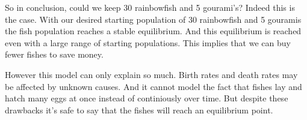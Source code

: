 \begin{flushleft}
    So in conclusion, could we keep 30 rainbowfish and 5 gourami's?
    Indeed this is the case. With our desired starting population of
    30 rainbowfish and 5 gouramis the fish population reaches a stable equilibrium.
    And this equilibrium is reached even with a large range of starting populations.
    This implies that we can buy fewer fishes to save money.
\end{flushleft}

\begin{flushleft}
    However this model can only explain so much. Birth rates and death
    rates may be affected by unknown causes. And it cannot model the fact
    that fishes lay and hatch many eggs at once instead of continiously over time.
    But despite these drawbacks it's safe to say that the fishes will reach an
    equilibrium point.
\end{flushleft}

